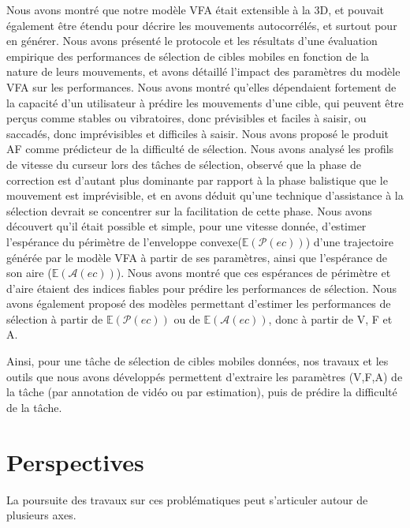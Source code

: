	Nous avons montré que notre modèle VFA était extensible à la 3D, et pouvait également être étendu pour décrire les mouvements autocorrélés, et surtout pour en générer. Nous avons présenté le protocole et les résultats d'une évaluation empirique des performances de sélection de cibles mobiles en fonction de la nature de leurs mouvements, et avons détaillé l'impact des paramètres du modèle VFA sur les performances. Nous avons montré qu'elles dépendaient fortement de la capacité d'un utilisateur à prédire les mouvements d'une cible, qui peuvent être perçus comme stables ou vibratoires, donc prévisibles et faciles à saisir, ou saccadés, donc imprévisibles et difficiles à saisir. Nous avons proposé le produit AF comme prédicteur de la difficulté de sélection. Nous avons analysé les profils de vitesse du curseur lors des tâches de sélection, observé que la phase de correction est d'autant plus dominante par rapport à la phase balistique que le mouvement est imprévisible, et en avons déduit qu'une technique d'assistance à la sélection devrait se concentrer sur la facilitation de cette phase. Nous avons découvert qu'il était possible et simple, pour une vitesse donnée, d'estimer l'espérance du périmètre de l'enveloppe convexe($\mathbb{E}(\mathcal{P}(ec))$) d'une trajectoire générée par le modèle VFA à partir de ses paramètres, ainsi que l'espérance de son aire ($\mathbb{E}(\mathcal{A}(ec))$). Nous avons montré que ces espérances de périmètre et d'aire étaient des indices fiables pour prédire les performances de sélection. Nous avons également proposé des modèles permettant d'estimer les performances de sélection à partir de $\mathbb{E}(\mathcal{P}(ec))$ ou de $\mathbb{E}(\mathcal{A}(ec))$, donc à partir de V, F et A.
	
	Ainsi, pour une tâche de sélection de cibles mobiles données, nos travaux et les outils que nous avons développés permettent d'extraire les paramètres (V,F,A) de la tâche (par annotation de vidéo ou par estimation), puis de prédire la difficulté de la tâche.
	
	
	
	\section*{Perspectives}
	La poursuite des travaux sur ces problématiques peut s'articuler autour de plusieurs axes.
	
